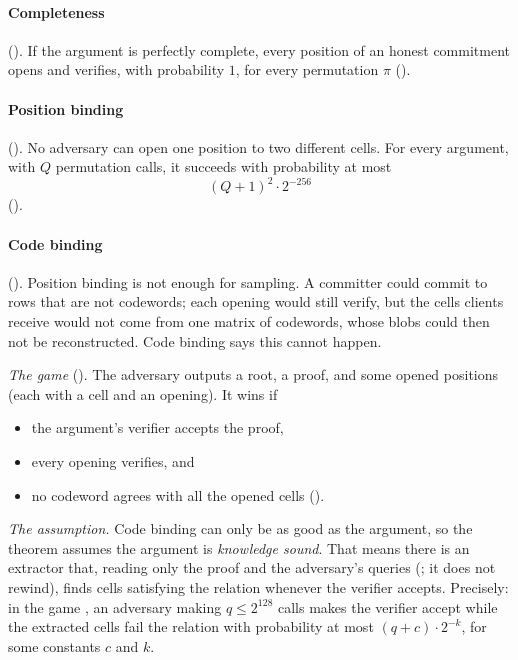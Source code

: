 \documentclass[11pt]{article}
\begin{document}
\paragraph{Completeness} (). If the argument is perfectly
complete, every position of an honest commitment opens and verifies, with probability $1$, for
every permutation $\pi$ ().

\paragraph{Position binding} (). No adversary can open one
position to two different cells. For every argument, with $Q$ permutation calls, it succeeds with
probability at most
\[
\boxed{\ (Q+1)^2\cdot 2^{-256}\ }
\]
().

\paragraph{Code binding} (). Position binding is not enough for
sampling. A committer could commit to rows that are not codewords; each opening would still
verify, but the cells clients receive would not come from one matrix of codewords, whose blobs could then not
be reconstructed. Code binding says this cannot happen.

\emph{The game} (). The adversary outputs a root, a proof, and some opened
positions (each with a cell and an opening). It wins if
\begin{itemize}
\item the argument's verifier accepts the proof,
\item every opening verifies, and
\item no codeword agrees with all the opened cells ().
\end{itemize}

\emph{The assumption.} Code binding can only be as good as the argument, so the theorem assumes the
argument is \emph{knowledge sound}. That means there is an extractor that, reading only the proof
and the adversary's queries (; it does not rewind), finds cells satisfying the
relation whenever the verifier accepts. Precisely: in the game , an adversary making
$q \le 2^{128}$ calls makes the verifier accept while the extracted cells fail the relation with
probability at most $(q + c)\cdot 2^{-k}$, for some constants $c$ and $k$.
\end{document}
